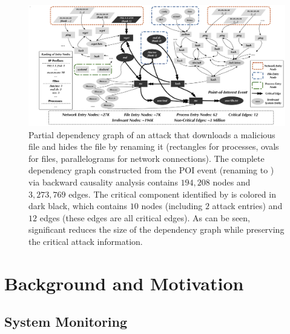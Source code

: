  

\begin{figure}[!t]
    \centering
    \includegraphics[width=\textwidth, keepaspectratio]{figs/s&p/overview.pdf}
    \caption{Partial dependency graph of an attack that downloads a malicious file and hides the file by renaming it (rectangles for processes, ovals for files, parallelograms for network connections).
    The complete dependency graph constructed from the POI event (renaming to ) via backward causality analysis contains $194,208$ nodes and $3,273,769$ edges.
    The critical component identified by \tool is colored in dark black, which contains $10$ nodes (including $2$ attack entries) and $12$ edges (these edges are all critical edges).
    As can be seen, \tool significant reduces the size of the dependency graph while preserving the critical attack information.
    }

    \label{fig:motivate}
\end{figure}


\section{Background and Motivation}

\subsection{System Monitoring}
\label{subsec:system-monitoring}

